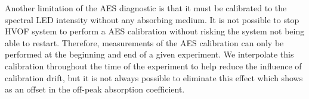 Another limitation of the AES diagnostic is that it must be calibrated to the spectral LED intensity without any absorbing medium. It is not possible to stop HVOF system to perform a AES calibration without risking the system not being able to restart. Therefore, measurements of the AES calibration can only be performed at the beginning and end of a given experiment. We interpolate this calibration throughout the time of the experiment to help reduce the influence of calibration drift, but it is not always possible to eliminate this effect which shows as an offset in the off-peak absorption coefficient.

